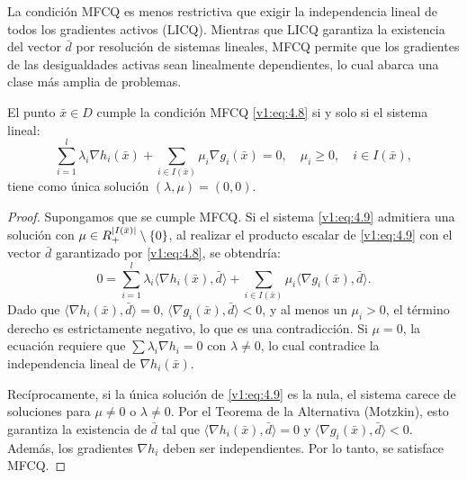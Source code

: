 \begin{remark}
 La condición MFCQ es menos restrictiva que exigir la independencia lineal de todos los gradientes activos (LICQ). Mientras que LICQ garantiza la existencia del vector $\bar{d}$ por resolución de sistemas lineales, MFCQ permite que los gradientes de las desigualdades activas sean linealmente dependientes, lo cual abarca una clase más amplia de problemas.
\end{remark}

\begin{proposition}\label{v1:prop:4.1.2}
 El punto $\bar{x} \in D$ cumple la condición MFCQ \eqref{v1:eq:4.8} si y solo si el sistema lineal:
 \begin{equation}
 \sum_{i=1}^l \lambda_i \nabla h_i(\bar{x}) + \sum_{i \in I(\bar{x})} \mu_i \nabla g_i(\bar{x}) = 0, \quad \mu_i \ge 0, \quad i \in I(\bar{x}),
 \label{v1:eq:4.9}
 \end{equation}
 tiene como única solución $(\lambda, \mu) = (0, 0)$.
\end{proposition}

\begin{proof}
 Supongamos que se cumple MFCQ. Si el sistema \eqref{v1:eq:4.9} admitiera una solución con $\mu \in R_+^{|I(\bar{x})|} \setminus \{0\}$, al realizar el producto escalar de \eqref{v1:eq:4.9} con el vector $\bar{d}$ garantizado por \eqref{v1:eq:4.8}, se obtendría:
 \[
 0 = \sum_{i=1}^l \lambda_i \langle \nabla h_i(\bar{x}), \bar{d} \rangle + \sum_{i \in I(\bar{x})} \mu_i \langle \nabla g_i(\bar{x}), \bar{d} \rangle.
 \]
 Dado que $\langle \nabla h_i(\bar{x}), \bar{d} \rangle = 0$, $\langle \nabla g_i(\bar{x}), \bar{d} \rangle < 0$, y al menos un $\mu_i > 0$, el término derecho es estrictamente negativo, lo que es una contradicción. Si $\mu = 0$, la ecuación requiere que $\sum \lambda_i \nabla h_i = 0$ con $\lambda \neq 0$, lo cual contradice la independencia lineal de $\nabla h_i(\bar{x})$.
 
 Recíprocamente, si la única solución de \eqref{v1:eq:4.9} es la nula, el sistema carece de soluciones para $\mu \neq 0$ o $\lambda \neq 0$. Por el Teorema de la Alternativa (Motzkin), esto garantiza la existencia de $\bar{d}$ tal que $\langle \nabla h_i(\bar{x}), \bar{d} \rangle = 0$ y $\langle \nabla g_i(\bar{x}), \bar{d} \rangle < 0$. Además, los gradientes $\nabla h_i$ deben ser independientes. Por lo tanto, se satisface MFCQ.
\end{proof}

